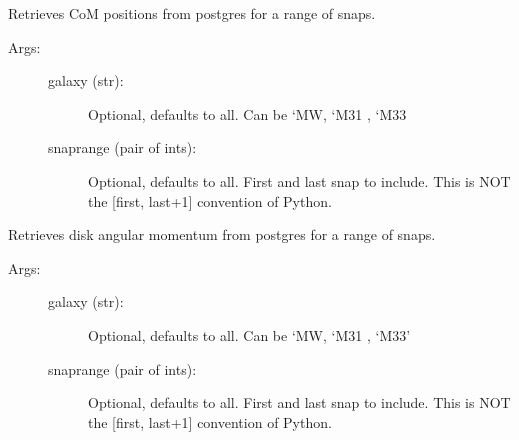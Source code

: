 \documentclass[letterpaper,10pt,english]{sphinxmanual}
\begin{document}
\begin{fulllineitems}
\begin{fulllineitems}
\end{fulllineitems}


\begin{fulllineitems}
\label{\detokenize{timecourse:galaxy.timecourse.TimeCourse.read_com_db}}
Retrieves CoM positions from postgres for a range of snaps.
\begin{description}
\item[{Args:}] \leavevmode\begin{description}
\item[{galaxy (str):}] \leavevmode
Optional, defaults to all. Can be ‘MW, ‘M31 , ‘M33

\item[{snaprange (pair of ints):}] \leavevmode
Optional, defaults to all. First and last snap to include.
This is NOT the {[}first, last+1{]} convention of Python.

\end{description}

\end{description}

\end{fulllineitems}


\begin{fulllineitems}
\label{\detokenize{timecourse:galaxy.timecourse.TimeCourse.read_angmom_db}}
Retrieves disk angular momentum from postgres for a range of snaps.
\begin{description}
\item[{Args:}] \leavevmode\begin{description}
\item[{galaxy (str):}] \leavevmode
Optional, defaults to all. Can be ‘MW, ‘M31 , ‘M33’

\item[{snaprange (pair of ints):}] \leavevmode
Optional, defaults to all. First and last snap to include.
This is NOT the {[}first, last+1{]} convention of Python.


\end{description}
\end{description}
\end{fulllineitems}
\end{fulllineitems}
\end{document}
